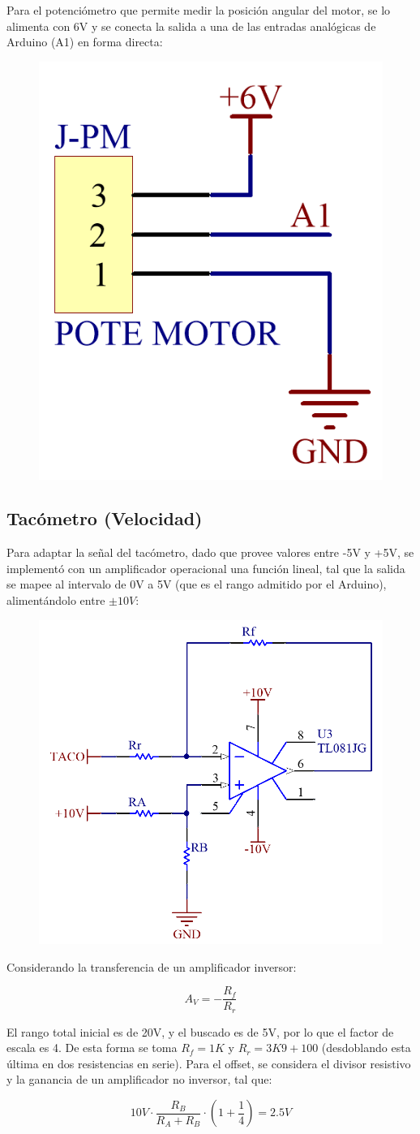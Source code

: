 \documentclass{article}
\begin{document}
Para el potenciómetro que permite medir la posición angular del motor, se lo alimenta con 6V y se conecta la salida a una de las entradas analógicas de Arduino (A1) en forma directa:

\begin{figure}[H]
\centering
\includegraphics[width=0.15\linewidth]{../Images/PoteMotor.png}
\end{figure}

\subsection{Tacómetro (Velocidad)}
Para adaptar la señal del tacómetro, dado que provee valores entre -5V y +5V, se implementó con un amplificador operacional una función lineal, tal que la salida se mapee al intervalo de 0V a 5V (que es el rango admitido por el Arduino), alimentándolo entre $\pm 10V$: \par

\begin{figure}[H]
\centering
\includegraphics[width=0.4\linewidth]{../Images/ModeloFuncion.png}
\end{figure}

Considerando la transferencia de un amplificador inversor:

\[
A_V = - \frac{R_f}{R_r}
\]

El rango total inicial es de 20V, y el buscado es de 5V, por lo que el factor de escala es 4. De esta forma se toma $R_f = 1K$ y $R_r = 3K9 + 100$ (desdoblando esta última en dos resistencias en serie). Para el offset, se considera el divisor resistivo y la ganancia de un amplificador no inversor, tal que:

\[
10V \cdot \frac{R_B}{R_A + R_B} \cdot \left(1 + \frac{1}{4}\right) = 2.5V
\]
\end{document}
